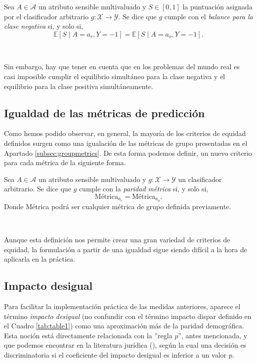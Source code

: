 \documentclass[oneside,openright,titlepage,numbers=noenddot,openany,headinclude,footinclude=true,
cleardoublepage=empty,abstractoff,BCOR=5mm,paper=a4,fontsize=12pt,main=spanish]{scrreprt}
\begin{document}
\begin{definition}
Sea $A \in \mathcal{A}$ un atributo sensible multivaluado y $S\in [0,1]$ la puntuación asignada por el clasificador arbitrario $g\colon \mathcal{X} \to \mathcal{Y}$. Se dice que $g$ cumple con el \textit{balance para la clase negativa} si, y solo si, $$\mathbb{E}[S \mid A=a_r, Y=-1]=\mathbb{E}[S \mid A=a_o, Y=-1].$$
\end{definition}\

Sin embargo, hay que tener en cuenta que
en los problemas del mundo real es casi imposible cumplir el equilibrio simultáneo para la clase negativa y el equilibrio para la clase positiva simultáneamente.

\clearpage

\subsection{Igualdad de las métricas de predicción}

Como hemos podido observar, en general, la mayoría de los criterios de equidad definidos surgen como una igualación de las métricas de grupo presentadas en el Apartado \ref{subsec:groupmetrics}. De esta forma podemos definir, un nuevo criterio para cada métrica de la siguiente forma.\\

\begin{definition}\label{def:parmetr}
Sea $A \in \mathcal{A}$ un atributo sensible multivaluado y $g\colon \mathcal{X} \to \mathcal{Y}$ un clasificador arbitrario. Se dice que $g$ cumple con la \textit{paridad métrica} si, y solo si, $$\text{Métrica}_{a_r}=\text{Métrica}_{a_o}.$$
Donde Métrica podrá ser cualquier métrica de grupo definida previamente. 
\end{definition}\

Aunque esta definición nos permite crear una gran variedad de criterios de equidad, la formulación a partir de una igualdad sigue siendo difícil a la hora de aplicarla en la práctica. 

\subsection{Impacto desigual}

Para facilitar la implementación práctica de las medidas anteriores, aparece el término \textit{impacto desigual} (no confundir con el término impacto dispar definido en el Cuadro \ref{tab:table1}) como una aproximación más de la paridad demográfica. Esta noción está directamente relacionada con la ''regla $p$'', antes mencionada, y que podemos encontrar en la literatura jurídica (\cite{prule2018}), según la cual una decisión es discriminatoria si el coeficiente del impacto desigual es inferior a un valor $p$.\\
\end{document}
